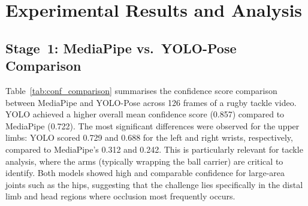 \documentclass{article}
\begin{document}
\section{Experimental Results and Analysis}
\label{sec:results}

\subsection{Stage~1: MediaPipe vs.\ YOLO-Pose Comparison}
\label{sec:res:stage1}

Table~\ref{tab:conf_comparison} summarises the confidence score
comparison between MediaPipe and YOLO-Pose across 126 frames of a rugby
tackle video.
YOLO achieved a higher overall mean confidence score (0.857) compared
to MediaPipe (0.722).
The most significant differences were observed for the upper limbs:
YOLO scored 0.729 and 0.688 for the left and right wrists,
respectively, compared to MediaPipe's 0.312 and 0.242.
This is particularly relevant for tackle analysis, where the arms
(typically wrapping the ball carrier) are critical to identify.
Both models showed high and comparable confidence for large-area joints
such as the hips, suggesting that the challenge lies specifically in the
distal limb and head regions where occlusion most frequently occurs.
\end{document}
